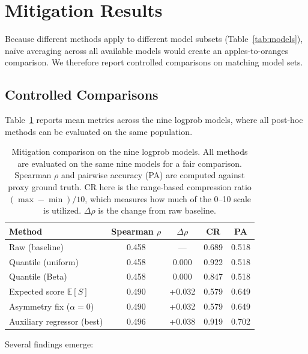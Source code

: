 \documentclass[11pt]{article}
\begin{document}
\section{Mitigation Results}
\label{sec:mitresults}

Because different methods apply to different model subsets (Table~\ref{tab:models}), na\"ive averaging across all available models would create an apples-to-oranges comparison. We therefore report controlled comparisons on matching model sets.

\subsection{Controlled Comparisons}

Table~\ref{tab:mitcompare} reports mean metrics across the nine logprob models, where all post-hoc methods can be evaluated on the same population.

\begin{table}[t]
\centering
\caption{Mitigation comparison on the nine logprob models. All methods are evaluated on the same nine models for a fair comparison. Spearman $\rho$ and pairwise accuracy (PA) are computed against proxy ground truth. CR here is the range-based compression ratio $(\max - \min)/10$, which measures how much of the 0--10 scale is utilized. $\Delta\rho$ is the change from raw baseline.}
\label{tab:mitcompare}
\begin{tabular}{@{}lcccc@{}}
\toprule
\textbf{Method} & \textbf{Spearman} $\rho$ & $\Delta\rho$ & \textbf{CR} & \textbf{PA} \\
\midrule
Raw (baseline) & 0.458 & --- & 0.689 & 0.518 \\
Quantile (uniform) & 0.458 & 0.000 & 0.922 & 0.518 \\
Quantile (Beta) & 0.458 & 0.000 & 0.847 & 0.518 \\
Expected score $\mathbb{E}[S]$ & 0.490 & +0.032 & 0.579 & 0.649 \\
Asymmetry fix ($\alpha = 0$) & 0.490 & +0.032 & 0.579 & 0.649 \\
Auxiliary regressor (best) & 0.496 & +0.038 & 0.919 & 0.702 \\
\bottomrule
\end{tabular}
\end{table}

Several findings emerge:
\end{document}
